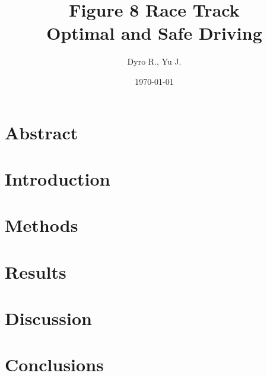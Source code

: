 \documentclass[lettersize]{article}
\title{Figure 8 Race Track\\Optimal and Safe Driving}
\author{Dyro R., Yu J.}
\date{\today}
\numberwithin{equation}{section}
\begin{document}
\clearpage\maketitle
\tableofcontents
\newpage

\section{Abstract}


\newpage
\section{Introduction}


\section{Methods}


\section{Results}


\section{Discussion}


\section{Conclusions}


\newpage
{}
\end{document}
